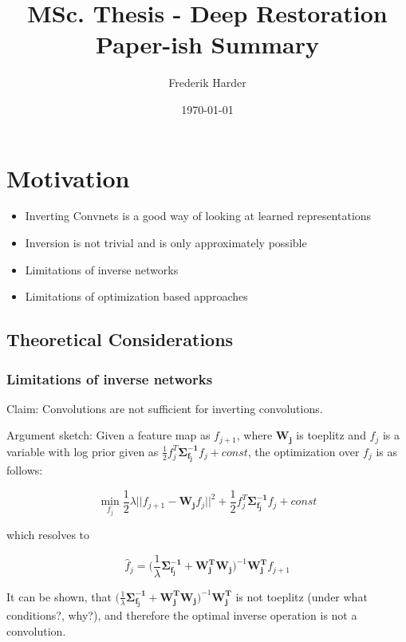 \documentclass{article}
\title{MSc. Thesis - Deep Restoration\\Paper-ish Summary}
\date{\today}
\author{Frederik Harder}
\begin{document}
\maketitle

\section{Motivation}

\begin{itemize}
	\item Inverting Convnets is a good way of looking at learned representations
	\item Inversion is not trivial and is only approximately possible
	\item Limitations of inverse networks 
	\item Limitations of optimization based approaches
\end{itemize}

\subsection{Theoretical Considerations}

\subsubsection{Limitations of inverse networks}

Claim: Convolutions are not sufficient for inverting convolutions.

Argument sketch: Given a feature map as $f_{j+1}$, where $\bm{W_j}$ is toeplitz and $f_j$ is a variable with log prior given as $\frac{1}{2} f_j^T \bm{\Sigma_{f_j}^{-1}}f_j + const$, the optimization over $f_j$ is as follows:

\begin{equation}
	\min_{f_j} \frac{1}{2} \lambda || f_{j+1} - \bm{W_j} f_j ||^2 + \frac{1}{2} f_j^T \bm{\Sigma_{f_j}^{-1}} f_j + const
\end{equation}

which resolves to 

\begin{equation}
\hat{f}_j =  \bigg( \frac{1}{\lambda}  \bm{\Sigma_{f_j}^{-1}} + \bm{W_j^T} \bm{W_j}\bigg)^{-1} \bm{W_j^T} f_{j+1}
\end{equation}

It can be shown, that $\big( \frac{1}{\lambda}  \bm{\Sigma_{f_j}^{-1}} + \bm{W_j^T} \bm{W_j}\big)^{-1} \bm{W_j^T}$ is not toeplitz (under what conditions?, why?), and therefore the optimal inverse operation is not a convolution.
\end{document}
